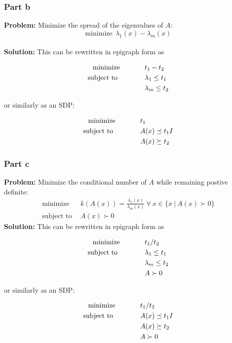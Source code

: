 \documentclass[letter]{article}
\newcommand{\optpblm}[3][eq:default]{
	\begin{equation}\label{#1}
		\begin{aligned}
			\text{minimize} \hspace{0.5in} &#2\vspace{5pt}\\
			\text{subject to \hspace{0.5in}} &#3
		\end{aligned}	
	\end{equation}
}
\begin{document}
\subsubsection{Part b}
\textbf{Problem:}
Minimize the spread of the eigenvalues of $A$: $$\text{minimize} \ \ \lambda_1(x) - \lambda_m(x)$$\\
\textbf{Solution:}
This can be rewritten in epigraph form as
\optpblm{t_1 - t_2}{\lambda_1 \leq t_1\\ & \lambda_m \leq t_2}
or similarly as an SDP:
\optpblm{t_1}{A(x) \preceq t_1 I\\ &A(x) \succeq t_2}


%
%




%

\newpage
\subsubsection{Part c}
\textbf{Problem:}
Minimize the conditional number of $A$ while remaining postive definite:
\begin{equation*}
	\begin{aligned}
		\text{minimize} \ \ &k(A(x)) = \frac{\lambda_1(x)}{\lambda_m(x)} \ \forall \ x \in \{x \ | \ A(x) \succ 0\}\\
		 \text{subject to} \ \ &A(x) \succ 0
	\end{aligned}
\end{equation*}
\textbf{Solution:}
This can be rewritten in epigraph form as
\optpblm{t_1 / t_2}{
	\lambda_1 \leq t_1\\
	& \lambda_m \leq t_2\\
	&A \succ 0
	}
or similarly as an SDP:
\optpblm{t_1 / t_2}{
	A(x) \preceq t_1 I\\
	&A(x) \succeq t_2\\
	&A \succ 0
	}
\end{document}
